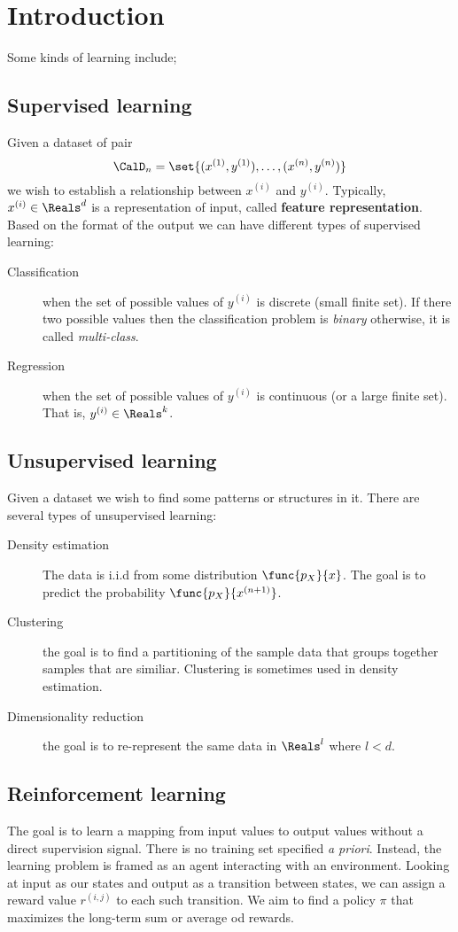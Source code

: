 \chapter{Introduction}
Some kinds of learning include;
\section{Supervised learning}
Given a dataset of pair
\begin{equation}
    \CalD_n = \set{(x^{(1)}, y^{(1)}) , \dots , (x^{(n)}, y^{(n)})}
\end{equation}
we wish to establish a relationship between \(x^{(i)} \) and \(y^{(i)}\). Typically, \(x^{(i)} \in \Reals^d\) is a representation of input, called \textbf{feature representation}. Based on the format of the output we can have different types of supervised learning:
\begin{description}
    \item [Classification] when the set of possible values of \(y^{(i)}\) is discrete (small finite set). If there two possible values then the classification problem is \textit{binary} otherwise, it is called \textit{multi-class}.
    \item [Regression] when the set of possible values of \(y^{(i)}\) is continuous (or a large finite set). That is, \(y^{(i)} \in \Reals^k\).
\end{description}

\section{Unsupervised learning}
Given a dataset we wish to find some patterns or structures in it. There are several types of unsupervised learning:
\begin{description}
    \item [Density estimation] The data is i.i.d from some distribution \(\func{p_X}{x}\). The goal is to predict the probability \(\func{p_X}{x^{(n+1)}}\).
    \item [Clustering] the goal is to find a partitioning of the sample data that groups together samples that are similiar. Clustering is sometimes used in density estimation.
    \item [Dimensionality reduction] the goal is to re-represent the same data in \(\Reals^l\) where \(l < d\).
\end{description}

\section{Reinforcement learning}
The goal is to learn a mapping from input values to output values without a direct supervision signal. There is no training set specified \textit{a priori}. Instead, the learning problem is framed as an agent interacting with an environment. Looking at input as our states and output as a transition between states, we can assign a reward value \(r^{(i,j)}\) to each such transition. We aim to find a policy \(\pi\) that maximizes the long-term sum or average od rewards.


